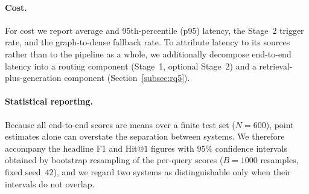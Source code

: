 \paragraph{Cost.}
For cost we report average and 95th-percentile (p95) latency, the Stage~2
trigger rate, and the graph-to-dense fallback rate. To attribute latency to its
sources rather than to the pipeline as a whole, we additionally decompose
end-to-end latency into a routing component (Stage~1, optional Stage~2) and a
retrieval-plus-generation component (Section~\ref{subsec:rq5}).

\paragraph{Statistical reporting.}
Because all end-to-end scores are means over a finite test set ($N=600$),
point estimates alone can overstate the separation between systems. We
therefore accompany the headline F1 and Hit@$1$ figures with $95\%$
confidence intervals obtained by bootstrap resampling of the per-query scores
($B=1000$ resamples, fixed seed~$42$), and we regard two systems as
distinguishable only when their intervals do not overlap.
